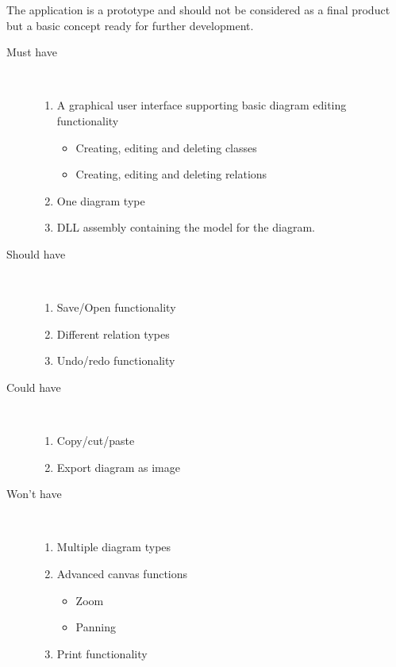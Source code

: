 The application is a prototype and should not be considered as a final product 
but a basic concept ready for further development.

\begin{description}
	\item[Must have] \hfill \\
	\begin{enumerate}
		\item A graphical user interface supporting basic diagram editing 
		functionality
		\begin{itemize}
			\item Creating, editing and deleting classes
			\item Creating, editing and deleting relations
		\end{itemize}
		\item One diagram type
		\item DLL assembly containing the model for the diagram.
	\end{enumerate}
	\item[Should have] \hfill \\
	\begin{enumerate}
		\item Save/Open functionality
		\item Different relation types
		\item Undo/redo functionality
	\end{enumerate}
	\item[Could have] \hfill \\
	\begin{enumerate}
		\item Copy/cut/paste
		\item Export diagram as image
	\end{enumerate}
	\item[Won't have] \hfill \\
	\begin{enumerate}
		\item Multiple diagram types
		\item Advanced canvas functions
		\begin{itemize}
			\item Zoom
			\item Panning
		\end{itemize}
		\item Print functionality
	\end{enumerate}
\end{description}





